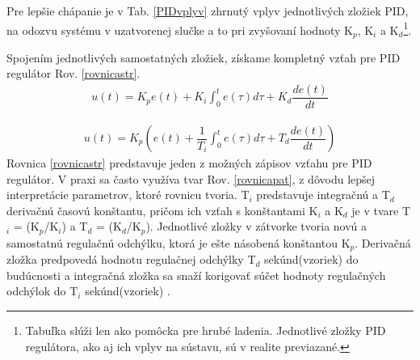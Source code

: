 Pre lepšie chápanie je v Tab. \ref{PIDvplyv} \cite{pidcontrol} zhrnutý vplyv jednotlivých zložiek PID, na odozvu systému v uzatvorenej slučke a to pri zvyšovaní hodnoty K$_p$, K$_i$ a K$_d$\footnote[10]{Tabuľka slúži len ako pomôcka pre hrubé ladenia. Jednotlivé zložky PID regulátora, ako aj ich vplyv na sústavu, sú v realite previazané.}. 

\begin{table}[!tbh]
	\caption{Odozva systému na zmenu konštánt.}
	\label{PIDvplyv}
\end{table}

Spojením jednotlivých samostatných zložiek, získame kompletný vzťah pre PID regulátor Rov. \ref{rovnicastr}.
\begin{align}
	\label{rovnicastr}
	u(t)=K_p e(t) + K_i  \int_{0}^{t} e(\tau)d\tau + K_d  \dfrac{de(t)}{dt}
\end{align}

\begin{align}
	\label{rovnicapat}
	u(t)=K_p \left(e(t) + \dfrac{1}{T_i}  \int_{0}^{t} e(\tau)d\tau + T_d  \dfrac{de(t)}{dt}\right)
\end{align}
Rovnica \ref{rovnicastr} predstavuje jeden z možných zápisov vzťahu pre PID regulátor. V praxi sa často využíva tvar Rov. \ref{rovnicapat}, z dôvodu lepšej interpretácie parametrov, ktoré rovnicu tvoria. T$_i$ predstavuje integračnú a T$_d$ derivačnú časovú konštantu, pričom ich vzťah s konštantami K$_i$ a K$_d$ je v tvare T$_i$ = (K$_p$/K$_i$) a T$_d$ = (K$_d$/K$_p$). Jednotlivé zložky v zátvorke tvoria novú a samostatnú regulačnú odchýlku, ktorá je ešte násobená konštantou K$_p$. Derivačná zložka predpovedá hodnotu regulačnej odchýlky T$_d$ sekúnd(vzoriek) do budúcnosti a integračná zložka sa snaží korigovať súčet hodnoty regulačných odchýlok do T$_i$ sekúnd(vzoriek) \cite{pidcontrol}.

